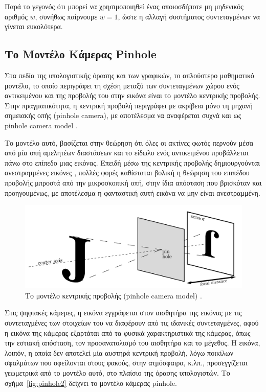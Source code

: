 Παρά το γεγονός ότι μπορεί να χρησιμοποιηθεί ένας οποιοσδήποτε μη μηδενικός αριθμός $w$, συνήθως παίρνουμε $w=1$, ώστε η αλλαγή συστήματος συντεταγμένων να γίνεται ευκολότερα.





\subsection{Το Μοντέλο Κάμερας Pinhole}



Στα πεδία της υπολογιστικής όρασης και των γραφικών, το απλούστερο μαθηματικό μοντέλο, το οποίο περιγράφει τη σχέση μεταξύ των συντεταγμένων χώρου ενός αντικειμένου και της προβολής του στην εικόνα είναι το μοντέλο κεντρικής προβολής. Στην πραγματικότητα, η κεντρική προβολή περιγράφει με ακρίβεια μόνο τη μηχανή σημειακής οπής (pinhole camera), με αποτέλεσμα να αναφέρεται συχνά και ως pinhole camera model \cite{hartley2003multiple} .


Το μοντέλο αυτό, βασίζεται στην θεώρηση ότι όλες οι ακτίνες φωτός περνούν μέσα από μία οπή αμελητέων διαστάσεων και το είδωλο ενός αντικειμένου προβάλλεται πάνω στο επίπεδο μιας εικόνας. Επειδή μέσω της κεντρικής προβολής δημιουργούνται ανεστραμμένες εικόνες \cite{fig:pinhole3}, πολλές φορές καθίσταται βολική η θεώρηση του επιπέδου προβολής μπροστά από την μικροσκοπική οπή, στην ίδια απόσταση που βρισκόταν και προηγουμένως, με αποτέλεσμα η φανταστική αυτή εικόνα να μην είναι ανεστραμμένη. 



\begin{figure}[H]
    \centering
    \includegraphics[scale=0.5, angle=0]{Files/Figures/pinhole3.png}
    \caption[Το μοντέλο κεντρικής προβολής (pinhole camera model)]{ Το μοντέλο κεντρικής προβολής (pinhole camera model) \cite{pinhole} .}
    \label{fig:pinhole3}
\end{figure}


Στις ψηφιακές κάμερες, η εικόνα εγγράφεται στον αισθητήρα της εικόνας με τις συντεταγμένες των στοιχείων του να διαφέρουν από τις ιδανικές συντεταγμένες, αφού η εικόνα της κάμερας εξαρτάται από τα φυσικά χαρακτηριστικά της κάμερας, όπως την εστιακή απόσταση, τον προσανατολισμό του αισθητήρα και το μέγεθος. H εικόνα, λοιπόν, η οποία δεν αποτελεί μία αυστηρά κεντρική προβολή, λόγω ποικίλων σφαλμάτων που οφείλονται στους φακούς, στην ατμόσφαιρα, κ.λπ., προσεγγίζεται γεωμετρικά από το μοντέλο αυτό, στο πλαίσιο της όρασης υπολογιστών. Το σχήμα~\ref{fig:pinhole2} δείχνει το μοντέλο κάμερας pinhole. 



